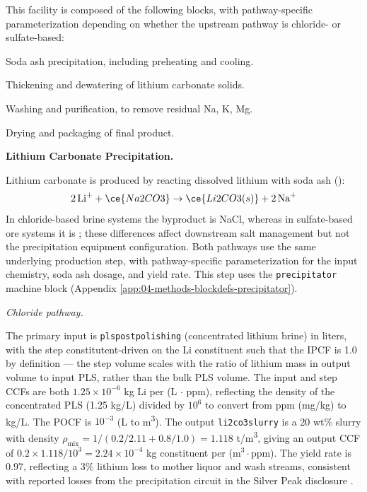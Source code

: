 \documentclass{article}
\renewcommand\_{\textunderscore\allowbreak}
\begin{document}
This facility is composed of the following blocks, with pathway-specific parameterization depending on whether the upstream pathway is chloride- or sulfate-based:

\begin{description}[noitemsep, topsep=0pt]
    \item[\textbullet\enskip\texttt{Lithium Carbonate Precipitation:}] Soda ash precipitation, including preheating and cooling.
    \item[\textbullet\enskip\texttt{Thickening and Dewatering:}] Thickening and dewatering of lithium carbonate solids.
    \item[\textbullet\enskip\texttt{Washing and Purification:}] Washing and purification, to remove residual Na, K, Mg. 
    \item[\textbullet\enskip\texttt{Drying and Packaging:}] Drying and packaging of final product.
\end{description}

\medskip
\noindent\textbf{Lithium Carbonate Precipitation.}\quad

Lithium carbonate is produced by reacting dissolved lithium with soda ash ():
\begin{equation}
    2\,\text{Li}^+ + \ce{Na2CO3} \rightarrow \ce{Li2CO3(s)} + 2\,\text{Na}^+
\end{equation}
In chloride-based brine systems the byproduct is NaCl, whereas in sulfate-based ore systems it is ; these differences affect downstream salt management but not the precipitation equipment configuration. Both pathways use the same underlying production step, with pathway-specific parameterization for the input chemistry, soda ash dosage, and yield rate.
This step uses the \texttt{precipitator} machine block (Appendix \ref{app:04-methods-blockdefs-precipitator}).

\medskip
\noindent\textit{Chloride pathway.}\quad
 
The primary input is \texttt{pls\_post\_polishing} (concentrated lithium brine) in liters, with the step constitutent-driven on the Li constituent such that the IPCF is 1.0 by definition --- the step volume scales with the ratio of lithium mass in output volume to input PLS, rather than the bulk PLS volume. The input and step CCFs are both $1.25 \times 10^{-6}$ kg Li per (L $\cdot$ ppm), reflecting the density of the concentrated PLS (1.25 kg/L) divided by $10^6$ to convert from ppm (mg/kg) to kg/L. The POCF is $10^{-3}$ (L to \si{m^3}). The output \texttt{li2co3\_slurry} is a 20 wt\%  slurry with density $\rho_\text{mix} = 1/(0.2/2.11 + 0.8/1.0) = 1.118$ \si{t/m^3}, giving an output CCF of $0.2 \times 1.118 / 10^3 = 2.24 \times 10^{-4}$ kg constituent per (m$^3 \cdot$ppm). The yield rate is 0.97, reflecting a 3\% lithium loss to mother liquor and wash streams, consistent with reported losses from the precipitation circuit in the Silver Peak disclosure \cite{srkconsultingSECTechnicalReport2023a}.
 
\end{document}
